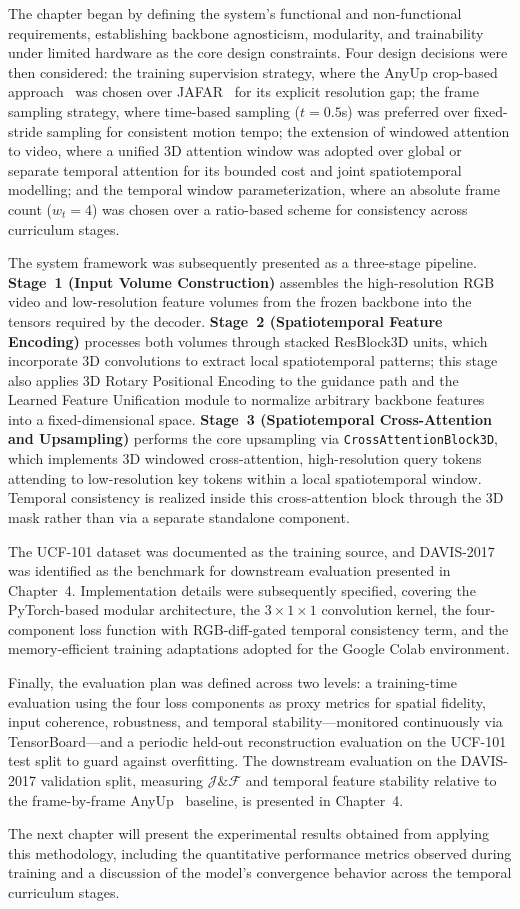The chapter began by defining the system's functional and non-functional requirements, establishing backbone agnosticism, modularity, and trainability under limited hardware as the core design constraints. Four design decisions were then considered: the training supervision strategy, where the AnyUp crop-based approach~\cite{anyup} was chosen over JAFAR~\cite{couairon2025} for its explicit resolution gap; the frame sampling strategy, where time-based sampling ($t = 0.5$s) was preferred over fixed-stride sampling for consistent motion tempo; the extension of windowed attention to video, where a unified 3D attention window was adopted over global or separate temporal attention for its bounded cost and joint spatiotemporal modelling; and the temporal window parameterization, where an absolute frame count ($w_t = 4$) was chosen over a ratio-based scheme for consistency across curriculum stages.

The system framework was subsequently presented as a three-stage pipeline. \textbf{Stage~1 (Input Volume Construction)} assembles the high-resolution RGB video and low-resolution feature volumes from the frozen backbone into the tensors required by the decoder. \textbf{Stage~2 (Spatiotemporal Feature Encoding)} processes both volumes through stacked ResBlock3D units, which incorporate 3D convolutions to extract local spatiotemporal patterns; this stage also applies 3D Rotary Positional Encoding to the guidance path and the Learned Feature Unification module to normalize arbitrary backbone features into a fixed-dimensional space. \textbf{Stage~3 (Spatiotemporal Cross-Attention and Upsampling)} performs the core upsampling via \texttt{CrossAttentionBlock3D}, which implements 3D windowed cross-attention, high-resolution query tokens attending to low-resolution key tokens within a local spatiotemporal window. Temporal consistency is realized inside this cross-attention block through the 3D mask rather than via a separate standalone component.

The UCF-101 dataset was documented as the training source, and DAVIS-2017 was identified as the benchmark for downstream evaluation presented in Chapter~4. Implementation details were subsequently specified, covering the PyTorch-based modular architecture, the $3 \times 1 \times 1$ convolution kernel, the four-component loss function with RGB-diff-gated temporal consistency term, and the memory-efficient training adaptations adopted for the Google Colab environment.

Finally, the evaluation plan was defined across two levels: a training-time evaluation using the four loss components as proxy metrics for spatial fidelity, input coherence, robustness, and temporal stability---monitored continuously via TensorBoard---and a periodic held-out reconstruction evaluation on the UCF-101 test split to guard against overfitting. The downstream evaluation on the DAVIS-2017 validation split, measuring $\mathcal{J}\&\mathcal{F}$ and temporal feature stability relative to the frame-by-frame AnyUp~\cite{anyup} baseline, is presented in Chapter~4.

The next chapter will present the experimental results obtained from applying this methodology, including the quantitative performance metrics observed during training and a discussion of the model's convergence behavior across the temporal curriculum stages.